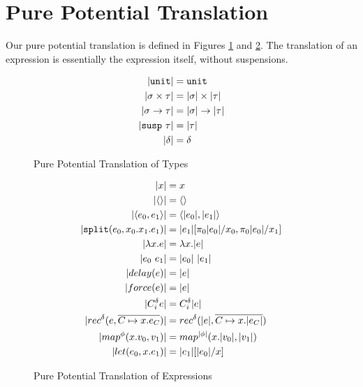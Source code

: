 \section{Pure Potential Translation}
Our pure potential translation is defined in Figures
\ref{fig:pure_potential_translation_types} and
\ref{fig:pure_potential_translation_expressions}. The translation of an
expression is essentially the expression itself, without suspensions.
%
\begin{figure}
  \caption{Pure Potential Translation of Types}
  \label{fig:pure_potential_translation_types}
  \begin{align*}
    |\texttt{unit}| &= \texttt{unit} \\
    |\sigma \times \tau| &= |\sigma| \times |\tau| \\
    |\sigma \to \tau| &= |\sigma| \to |\tau| \\
    |\texttt{susp}\ \tau| &= |\tau| \\
    |\delta| &= \delta
  \end{align*}
\end{figure}
%
\begin{figure}
  \caption{Pure Potential Translation of Expressions}
  \label{fig:pure_potential_translation_expressions}
  \begin{align*}
    |x| &= x                                                                                     \\
    |\LP\RP| &= \LP\RP                                                           \\
    |\LP e_0, e_1 \RP | &= \LP |e_0|, |e_1| \RP                                  \\
    |\texttt{split}(e_0, x_0. x_1. e_1)| &= |e_1|[\pi_0|e_0|/x_0, \pi_0|e_0|/x_1]                \\
    |\lambda x.e | &= \lambda x.|e|                                                              \\
    |e_0\ e_1| &= |e_0|\ |e_1|                                                                   \\
    |delay(e)| &= |e|                                                                            \\
    |force(e)| &= |e|                                                                            \\
    |C_i^\delta e| &= C_i^\delta |e|                                                             \\
    |rec^\delta(e, \overline{C \mapsto x.e_C})| &= rec^\delta(|e|, \overline{C \mapsto x.|e_C|}) \\
    |map^\phi(x.v_0, v_1)| &= map^{|\phi|}(x.|v_0|, |v_1|)                                       \\
    |let(e_0, x.e_1)| &= |e_1|[|e_0|/x]
  \end{align*}
\end{figure}
%
